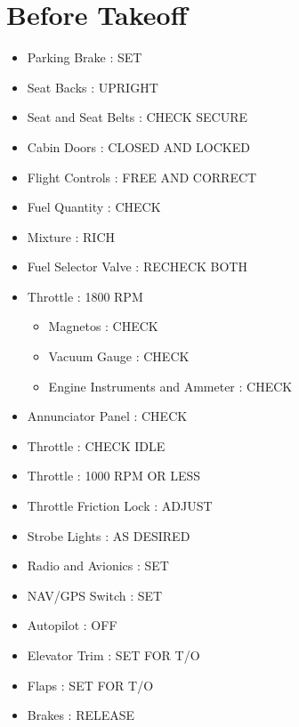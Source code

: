 \chapter{Before Takeoff}
\label{beforetakeoff}

\begin{itemize}
\item{} Parking Brake : SET

\item{} Seat Backs : UPRIGHT

\item{} Seat and Seat Belts : CHECK SECURE

\item{} Cabin Doors : CLOSED AND LOCKED

\item{} Flight Controls : FREE AND CORRECT

\item{} Fuel Quantity : CHECK

\item{} Mixture : RICH

\item{} Fuel Selector Valve : RECHECK BOTH

\item{} Throttle : 1800 RPM

\begin{itemize}
\item{} Magnetos : CHECK

\item{} Vacuum Gauge : CHECK

\item{} Engine Instruments and Ammeter : CHECK

\end{itemize}

\item{} Annunciator Panel : CHECK

\item{} Throttle : CHECK IDLE

\item{} Throttle : 1000 RPM OR LESS

\item{} Throttle Friction Lock : ADJUST

\item{} Strobe Lights : AS DESIRED

\item{} Radio and Avionics : SET

\item{} NAV\slash GPS Switch : SET

\item{} Autopilot : OFF

\item{} Elevator Trim : SET FOR T\slash O

\item{} Flaps : SET FOR T\slash O

\item{} Brakes : RELEASE

\end{itemize}

